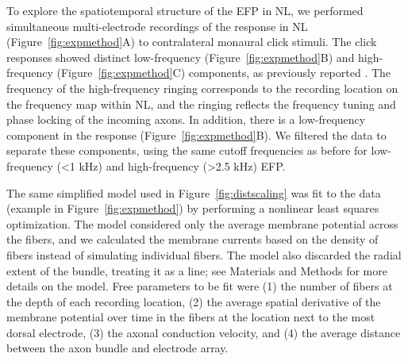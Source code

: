 \documentclass[]{elife}
\begin{document}
To explore the spatiotemporal structure of the EFP in NL, we performed
simultaneous multi-electrode recordings of the response in NL
(Figure~\ref{fig:expmethod}A) to contralateral monaural click stimuli.
The click responses showed distinct low-frequency
(Figure~\ref{fig:expmethod}B) and high-frequency
(Figure~\ref{fig:expmethod}C) components, as previously reported
\citep{wagner09}. The frequency of the high-frequency ringing
corresponds to the recording location on the frequency map within NL,
and the ringing reflects the frequency tuning and phase locking of the
incoming axons. In addition, there is a low-frequency component in the
response (Figure~\ref{fig:expmethod}B). We filtered the data to separate
these components, using the same cutoff frequencies as before for
low-frequency (\textless{}1 kHz) and high-frequency (\textgreater{}2.5
kHz) EFP.

The same simplified model used in Figure~\ref{fig:distscaling} was fit
to the data (example in Figure~\ref{fig:expmethod}) by performing a
nonlinear least squares optimization. The model considered only the
average membrane potential across the fibers, and we calculated the
membrane currents based on the density of fibers instead of simulating
individual fibers. The model also discarded the radial extent of the
bundle, treating it as a line; see Materials and Methods for more
details on the model. Free parameters to be fit were (1) the number of
fibers at the depth of each recording location, (2) the average spatial
derivative of the membrane potential over time in the fibers at the
location next to the most dorsal electrode, (3) the axonal conduction
velocity, and (4) the average distance between the axon bundle and
electrode array.
\end{document}

